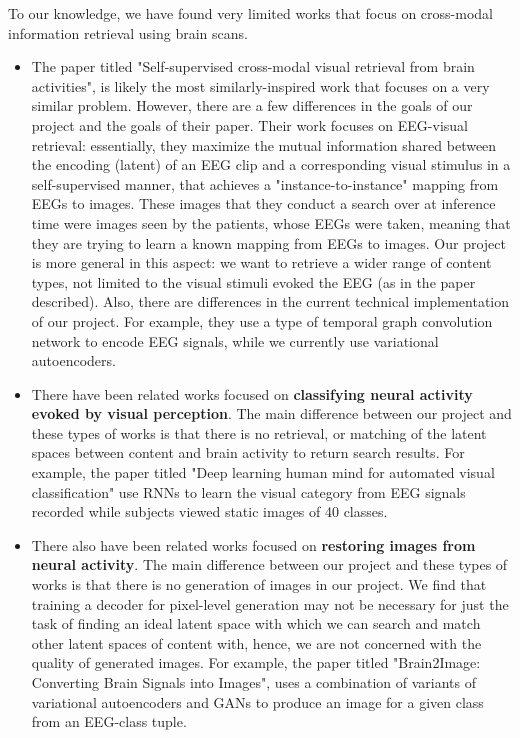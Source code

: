 \documentclass{article}
\begin{document}
To our knowledge, we have found very limited works that focus on cross-modal information retrieval using brain scans. 

\begin{itemize}
    \item The paper titled "Self-supervised cross-modal visual retrieval from brain activities", is likely the most similarly-inspired work that focuses on a very similar problem. However, there are a few differences in the goals of our project and the goals of their paper. Their work focuses on EEG-visual retrieval: essentially, they maximize the mutual information shared between the encoding (latent) of an EEG clip and a corresponding visual stimulus in a self-supervised manner, that achieves a "instance-to-instance" mapping from EEGs to images. These images that they conduct a search over at inference time were images seen by the patients, whose EEGs were taken, meaning that they are trying to learn a known mapping from EEGs to images. Our project is more general in this aspect: we want to retrieve a wider range of content types, not limited to the visual stimuli evoked the EEG (as in the paper described). Also, there are differences in the current technical implementation of our project. For example, they use a type of temporal graph convolution network to encode EEG signals, while we currently use variational autoencoders.
    \item There have been related works focused on \textbf{classifying neural activity evoked by visual perception}. The main difference between our project and these types of works is that there is no retrieval, or matching of the latent spaces between content and brain activity to return search results. For example, the paper titled "Deep learning human mind for automated visual classification" use RNNs to learn the visual category from EEG signals recorded while subjects viewed static images of 40 classes. 
    \item There also have been related works focused on \textbf{restoring images from neural activity}. The main difference between our project and these types of works is that there is no generation of images in our project. We find that training a decoder for pixel-level generation may not be necessary for just the task of finding an ideal latent space with which we can search and match other latent spaces of content with, hence, we are not concerned with the quality of generated images. For example, the paper titled "Brain2Image: Converting Brain Signals into Images", uses a combination of variants of variational autoencoders and GANs to produce an image for a given class from an EEG-class tuple.
\end{itemize}
\end{document}
